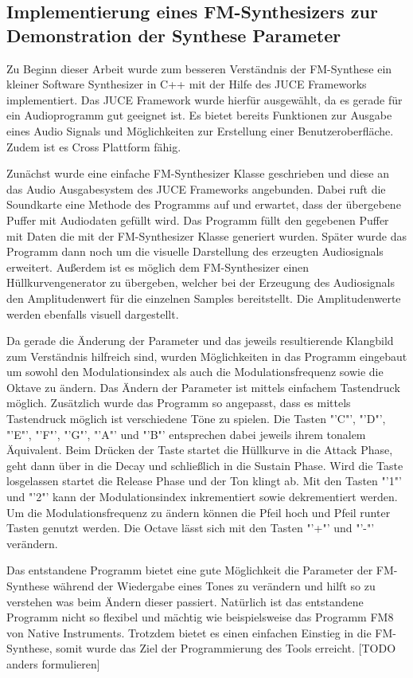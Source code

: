 \FloatBarrier
\subsection{Implementierung eines FM-Synthesizers zur Demonstration der Synthese Parameter}

Zu Beginn dieser Arbeit wurde zum besseren Verständnis der FM-Synthese ein kleiner Software Synthesizer in C++ mit der Hilfe des JUCE Frameworks implementiert. Das JUCE Framework wurde hierfür ausgewählt, da es gerade für ein Audioprogramm gut geeignet ist. Es bietet bereits Funktionen zur Ausgabe eines Audio Signals und Möglichkeiten zur Erstellung einer Benutzeroberfläche. Zudem ist es Cross Plattform fähig.

Zunächst wurde eine einfache FM-Synthesizer Klasse geschrieben und diese an das Audio Ausgabesystem des JUCE Frameworks angebunden. Dabei ruft die Soundkarte eine Methode des Programms auf und erwartet, dass der übergebene Puffer mit Audiodaten gefüllt wird. Das Programm füllt den gegebenen Puffer mit Daten die mit der FM-Synthesizer Klasse generiert wurden. Später wurde das Programm dann noch um die visuelle Darstellung des erzeugten Audiosignals erweitert. Außerdem ist es möglich dem FM-Synthesizer einen Hüllkurvengenerator zu übergeben, welcher bei der Erzeugung des Audiosignals den Amplitudenwert für die einzelnen Samples bereitstellt. Die Amplitudenwerte werden ebenfalls visuell dargestellt.

Da gerade die Änderung der Parameter und das jeweils resultierende Klangbild zum Verständnis hilfreich sind, wurden Möglichkeiten in das Programm eingebaut um sowohl den Modulationsindex als auch die Modulationsfrequenz sowie die Oktave zu ändern. Das Ändern der Parameter ist mittels einfachem Tastendruck möglich. Zusätzlich wurde das Programm so angepasst, dass es mittels Tastendruck möglich ist verschiedene Töne zu spielen. Die Tasten "'C"', "'D"', "'E"', "'F"', "'G"', "'A"' und "'B"' entsprechen dabei jeweils ihrem tonalem Äquivalent. Beim Drücken der Taste startet die Hüllkurve in die Attack Phase, geht dann über in die Decay und schließlich in die Sustain Phase. Wird die Taste losgelassen startet die Release Phase und der Ton klingt ab. Mit den Tasten "'1"' und "'2"' kann der Modulationsindex inkrementiert sowie dekrementiert werden. Um die Modulationsfrequenz zu ändern können die Pfeil hoch und Pfeil runter Tasten genutzt werden. Die Octave lässt sich mit den Tasten "'+"' und "'-"' verändern.

Das entstandene Programm bietet eine gute Möglichkeit die Parameter der FM-Synthese während der Wiedergabe eines Tones zu verändern und hilft so zu verstehen was beim Ändern dieser passiert. Natürlich ist das entstandene Programm nicht so flexibel und mächtig wie beispielsweise das Programm FM8 von Native Instruments. Trotzdem bietet es einen einfachen Einstieg in die FM-Synthese, somit wurde das Ziel der Programmierung des Tools erreicht. [TODO anders formulieren]
\FloatBarrier
